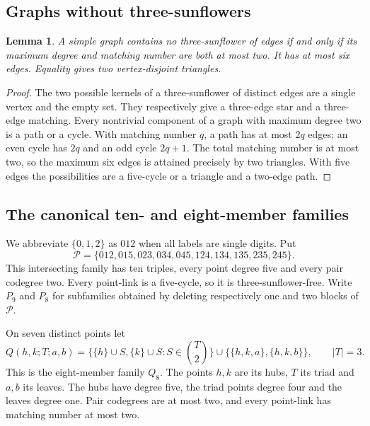 \documentclass[11pt,a4paper]{article}
\numberwithin{equation}{section}
\newtheorem{lemma}[theorem]{Lemma}
\theoremstyle{remark}
\newcommand{\Pten}{\mathcal P}
\begin{document}
\subsection{Graphs without three-sunflowers}
\begin{lemma}
\label{lem:sf2}
A simple graph contains no three-sunflower of edges if and only if its
maximum degree and matching number are both at most two. It has at most
six edges. Equality gives two vertex-disjoint triangles.
\end{lemma}
\begin{proof}
The two possible kernels of a three-sunflower of distinct edges are a
single vertex and the empty set. They respectively give a three-edge
star and a three-edge matching. Every nontrivial component of a graph
with maximum degree two is a path or a cycle. With matching number $ q $,
a path has at most $2q $ edges; an even cycle has $2q $ and an odd cycle
$2q+1$. The total matching number is at most two, so the maximum six
edges is attained precisely by two triangles. With five edges the
possibilities are a five-cycle or a triangle and a two-edge path.
\end{proof}

\subsection{The canonical ten- and eight-member families}
\label{sec:canonical}
We abbreviate $\{0,1,2\}$ as $012$ when all labels are single digits. Put
\[
 \Pten=\{012,015,023,034,045,124,134,135,235,245\}.
\]
This intersecting family has ten triples, every point degree five and
every pair codegree two. Every point-link is a five-cycle, so it is
three-sunflower-free. Write $ P_9$ and $ P_8$ for subfamilies obtained by
deleting respectively one and two blocks of $\Pten $.

On seven distinct points let
\[
 Q(h,k;T;a,b)=\{\{h\}\cup S,\{k\}\cup S:S\in\binom{T}{2}\}
 \cup\{\{h,k,a\},\{h,k,b\}\},\qquad |T|=3.
\]
This is the eight-member family $ Q_8$. The points $ h,k $ are its hubs,
$ T $ its triad and $ a,b $ its leaves. The hubs have degree five, the triad
points degree four and the leaves degree one. Pair codegrees are at
most two, and every point-link has matching number at most two.
\end{document}
